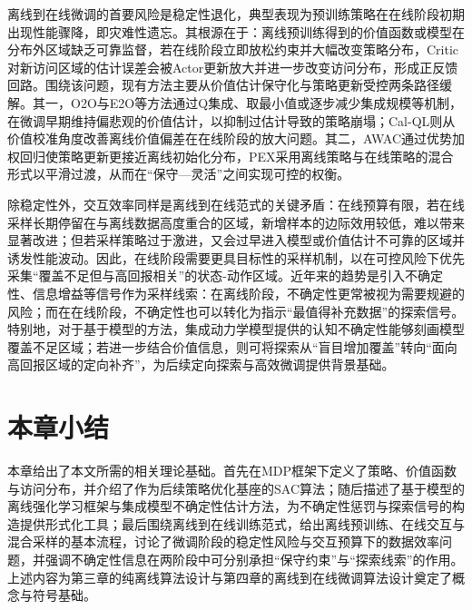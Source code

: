 离线到在线微调的首要风险是稳定性退化，典型表现为预训练策略在在线阶段初期出现性能骤降，即灾难性遗忘\cite{Lee2022O2O}。其根源在于：离线预训练得到的价值函数或模型在分布外区域缺乏可靠监督，若在线阶段立即放松约束并大幅改变策略分布，Critic对新访问区域的估计误差会被Actor更新放大并进一步改变访问分布，形成正反馈回路。围绕该问题，现有方法主要从价值估计保守化与策略更新受控两条路径缓解。其一，O2O\cite{Lee2022O2O}与E2O\cite{Zhao2023E2O}等方法通过Q集成、取最小值或逐步减少集成规模等机制，在微调早期维持偏悲观的价值估计，以抑制过估计导致的策略崩塌；Cal-QL\cite{Nakamoto2024CalQL}则从价值校准角度改善离线价值偏差在在线阶段的放大问题。其二，AWAC\cite{Nair2020AWAC}通过优势加权回归使策略更新更接近离线初始化分布，PEX\cite{Zhang2023PEX}采用离线策略与在线策略的混合形式以平滑过渡，从而在“保守—灵活”之间实现可控的权衡。

除稳定性外，交互效率同样是离线到在线范式的关键矛盾：在线预算有限，若在线采样长期停留在与离线数据高度重合的区域，新增样本的边际效用较低，难以带来显著改进；但若采样策略过于激进，又会过早进入模型或价值估计不可靠的区域并诱发性能波动。因此，在线阶段需要更具目标性的采样机制，以在可控风险下优先采集“覆盖不足但与高回报相关”的状态-动作区域。近年来的趋势是引入不确定性、信息增益等信号作为采样线索：在离线阶段，不确定性更常被视为需要规避的风险；而在在线阶段，不确定性也可以转化为指示“最值得补充数据”的探索信号。特别地，对于基于模型的方法，集成动力学模型提供的认知不确定性能够刻画模型覆盖不足区域；若进一步结合价值信息，则可将探索从“盲目增加覆盖”转向“面向高回报区域的定向补齐”，为后续定向探索与高效微调提供背景基础。


\section{本章小结}\label{Sec2.5}

本章给出了本文所需的相关理论基础。首先在MDP框架下定义了策略、价值函数与访问分布，并介绍了作为后续策略优化基座的SAC算法；随后描述了基于模型的离线强化学习框架与集成模型不确定性估计方法，为不确定性惩罚与探索信号的构造提供形式化工具；最后围绕离线到在线训练范式，给出离线预训练、在线交互与混合采样的基本流程，讨论了微调阶段的稳定性风险与交互预算下的数据效率问题，并强调不确定性信息在两阶段中可分别承担“保守约束”与“探索线索”的作用。上述内容为第三章的纯离线算法设计与第四章的离线到在线微调算法设计奠定了概念与符号基础。
